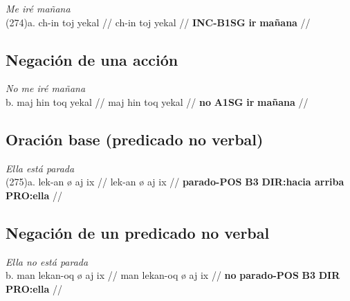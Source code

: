 \documentclass{article}%
\begin{document}
%
\par\medskip%
\ex
\textit{Me iré mañana} \\
\begingl
\gla (274)a. ch-in toj yekal //
\glb ch-in toj yekal //
\glc \textbf{INC-}\textbf{B1SG} \textbf{ir} \textbf{mañana} //
\endgl
\xe
%
\medskip%
\subsection{Negación de una acción}%
\label{subsec:Negacindeunaaccin}%

%
\par\medskip%
\ex
\textit{No me iré mañana} \\
\begingl
\gla b. maj hin toq yekal //
\glb maj hin toq yekal //
\glc \textbf{no} \textbf{A1SG} \textbf{ir} \textbf{mañana} //
\endgl
\xe
%
\medskip%
\subsection{Oración base (predicado no verbal)}%
\label{subsec:Oracinbase(predicadonoverbal)}%

%
\par\medskip%
\ex
\textit{Ella está parada} \\
\begingl
\gla (275)a. lek-an ø aj ix //
\glb lek-an ø aj ix //
\glc \textbf{parado-}\textbf{POS} \textbf{B3} \textbf{DIR:hacia arriba} \textbf{PRO:ella} //
\endgl
\xe
%
\medskip%
\subsection{Negación de un predicado no verbal}%
\label{subsec:Negacindeunpredicadonoverbal}%

%
\par\medskip%
\ex
\textit{Ella no está parada} \\
\begingl
\gla b. man lekan-oq ø aj ix //
\glb man lekan-oq ø aj ix //
\glc \textbf{no} \textbf{parado-}\textbf{POS} \textbf{B3} \textbf{DIR} \textbf{PRO:ella} //
\endgl
\xe
%
\medskip

%
\end{document}

